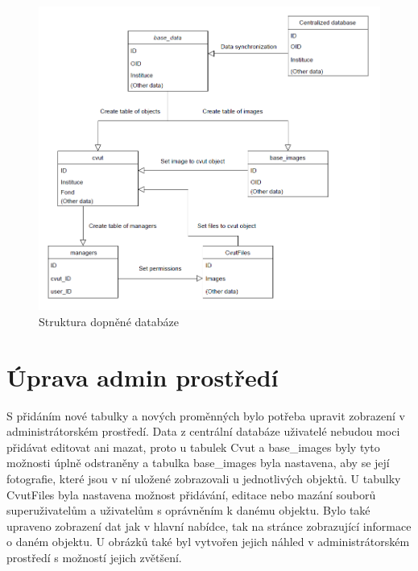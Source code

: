 \begin{figure}[H] \centering
    \includegraphics[width=400pt]{./pictures/23-db-diagram-2.PNG}
    \caption[Struktura dopněné databáze]{Struktura dopněné databáze}
	\label{fig:Struktura dopněné databáze}              
\end{figure}

\newpage

\section{Úprava admin prostředí}

S přidáním nové tabulky a nových proměnných bylo potřeba upravit zobrazení v administrátorském prostředí. Data z centrální databáze uživatelé nebudou moci přidávat editovat ani mazat, proto u tabulek Cvut a base\_images byly tyto možnosti úplně odstraněny a tabulka base\_images byla nastavena, aby se její fotografie, které jsou v ní uložené zobrazovali u jednotlivých objektů. U tabulky CvutFiles byla nastavena možnost přidávání, editace nebo mazání souborů superuživatelům a uživatelům s oprávněním k danému objektu. Bylo také upraveno zobrazení dat jak v hlavní nabídce, tak na stránce zobrazující informace o daném objektu. U obrázků také byl vytvořen jejich náhled v administrátorském prostředí s možností jejich zvětšení.

